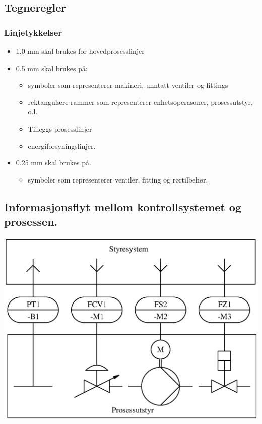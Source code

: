\vskip 5pt

\subsection{Tegneregler}

\subsubsection{Linjetykkelser}
\begin{itemize}
\item 1.0 mm skal brukes for hovedprosesslinjer
\item 0.5 mm skal brukes på:
\begin{itemize}
\item symboler som representerer makineri, unntatt ventiler og fittings
\item rektangulære rammer som representerer enhetsoperasoner, prosessutstyr,
o.l.
\item Tilleggs prosesslinjer
\item energiforsyningslinjer.
\end{itemize}
\item 0.25 mm skal brukes på.
\begin{itemize}
\item symboler som representerer ventiler, fitting og rørtilbehør.
\end{itemize}
\end{itemize}

\subsection{Informasjonsflyt mellom kontrollsystemet og prosessen. }

\includegraphics[width=1\textwidth]{./PandID01.eps}

